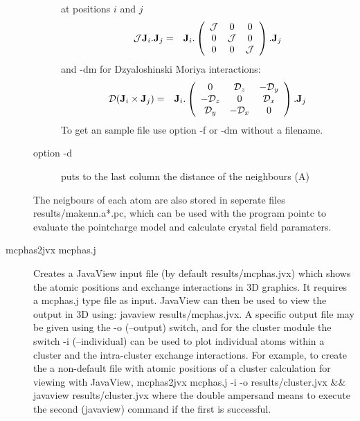 \begin{description}
\begin{description}
              at positions $i$ and $j$
\begin{eqnarray}
              \mathcal J \mathbf J_i . \mathbf J_j &  = & \mathbf J_i.
\left( \begin{array}{ccc}
 \mathcal J &  0 & 0\\
0 &   \mathcal J & 0 \\
0 &  0 &  \mathcal J \\
\end{array}
\right) .\mathbf J_j
\end{eqnarray}
              and -dm for Dzyaloshinski Moriya interactions:
\begin{eqnarray}
              \mathcal D (\mathbf J_i \times \mathbf J_j )&  = & \mathbf J_i.
\left( \begin{array}{ccc}
 0 &  \mathcal D_z & -\mathcal D_y\\
-\mathcal D_z &   0 &\mathcal D_x \\
\mathcal D_y &  -\mathcal D_x &  0 \\
\end{array}
\right) .\mathbf J_j
\end{eqnarray}
              To get an sample file use option -f or -dm without a filename.      
\item[option {\prg -d}] puts to the last column the distance of the neighbours (A)
\end{description}

The neigbours of each atom are also stored in seperate files
{\prg results\//makenn.a*.pc}, which can be used with the program {\prg pointc} to evaluate
the pointcharge model and calculate crystal field paramaters.
\item [\prg mcphas2jvx mcphas.j] 
Creates a JavaView input file (by default {\prg results/mcphas.jvx}) which shows the atomic positions 
and exchange interactions in 3D graphics. It requires a {\prg mcphas.j} type file as input. JavaView can
then be used to view the output in 3D using: {\prg javaview results/mcphas.jvx}. A specific output file 
may be given using the {\prg -o} ({\prg --output}) switch, and for the cluster module the switch {\prg -i} 
({\prg --individual}) can be used to plot individual atoms within a cluster and the intra-cluster exchange 
interactions. For example, to create the a non-default file with atomic positions of a cluster calculation 
for viewing with JavaView, {\prg mcphas2jvx mcphas.j -i -o results/cluster.jvx \&\& javaview results/cluster.jvx} 
where the double ampersand means to execute the second ({\prg javaview}) command if the first is successful.


\end{description}
